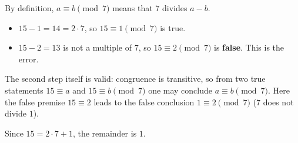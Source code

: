By definition, $a\equiv b\pmod 7$ means that $7$ divides $a-b$.

\begin{itemize}
\item $15-1=14=2\cdot7$, so $15\equiv1\pmod 7$ is true.
\item $15-2=13$ is not a multiple of $7$, so $15\equiv2\pmod7$ is \textbf{false}. This is the error.
\end{itemize}
The second step itself is valid: congruence is transitive, so from two true statements $15\equiv a$ and $15\equiv b\pmod 7$ one may conclude $a\equiv b\pmod7$. Here the false premise $15\equiv2$ leads to the false conclusion $1\equiv2\pmod7$ ($7$ does not divide $1$).

Since $15=2\cdot7+1$, the remainder is $\boxed{1}$.

